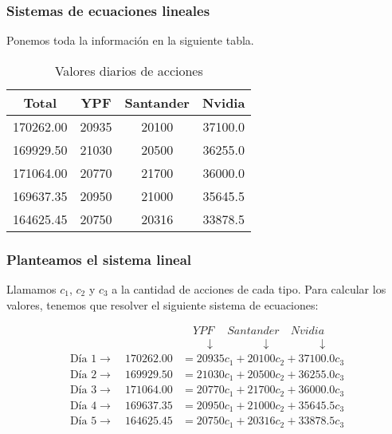 \documentclass[aspectratio=169,12pt]{beamer}
\begin{document}
\begin{frame}
\frametitle{Sistemas de ecuaciones lineales}

Ponemos toda la información en la siguiente tabla.

\begin{table}[h]
    \centering
    \begin{tabular}{|c|c|c|c|}
        \hline
        Total & YPF & Santander & Nvidia \\
        \hline
        170262.00 & 20935 & 20100 & 37100.0 \\
        169929.50 & 21030 & 20500 & 36255.0 \\
        171064.00 & 20770 & 21700 & 36000.0 \\
        169637.35 & 20950 & 21000 & 35645.5 \\
        164625.45 & 20750 & 20316 & 33878.5 \\
        \hline
    \end{tabular}
    \caption{Valores diarios de acciones}
    \label{tab:my_table}
\end{table}

\end{frame}


\begin{frame}
\frametitle{Planteamos el sistema lineal}

Llamamos $c_1$, $c_2$ y $c_3$ a la cantidad de acciones de cada tipo.
Para calcular los valores, tenemos que resolver el siguiente sistema de ecuaciones:

\begin{align*}
& \quad YPF \quad \ Santander \quad Nvidia \\
& \quad \quad \downarrow \quad  \quad  \quad  \quad \downarrow  \quad  \quad \quad \quad \downarrow  \\
\text{D\'ia 1} \rightarrow \quad 170262.00	&= 20935	c_1 + 20100 c_2 + 37100.0 c_3 \\
\text{D\'ia 2} \rightarrow \quad 169929.50	&= 21030	c_1 + 20500 c_2 + 36255.0 c_3 \\
\text{D\'ia 3} \rightarrow \quad 171064.00	&= 20770	c_1 + 21700 c_2 + 36000.0 c_3 \\
\text{D\'ia 4} \rightarrow \quad 169637.35	&= 20950	c_1 + 21000 c_2 + 35645.5 c_3 \\
\text{D\'ia 5} \rightarrow \quad 164625.45	&= 20750	c_1 + 20316 c_2 + 33878.5 c_3 \\
\end{align*}

\end{frame}
\end{document}
